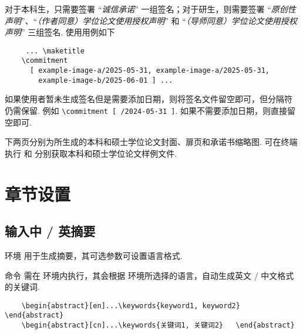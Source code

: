 对于本科生，只需要签署 ``\emph*{诚信承诺}'' 一组签名；对于研生，则需要签署 ``\emph*{原创性声明}''、``\emph*{（作者同意）学位论文使用授权声明}'' 和 ``\emph*{（导师同意）学位论文使用授权声明}'' 三组签名. 使用用例如下

\begin{framed}
  \begin{verbatim}
     ... \maketitle
    \commitment
      [ example-image-a/2025-05-31, example-image-a/2025-05-31,
        example-image-b/2025-06-01 ] ... 
  \end{verbatim}
\end{framed}

如果使用者暂未生成签名但是需要添加日期，则将签名文件留空即可，但分隔符 \cmd{/} 仍需保留. 例如 
\verb|\commitment [ /2024-05-31 ]|. 如果不需要添加日期，则直接留空即可.

下两页分别为所生成的本科和硕士学位论文封面、扉页和承诺书缩略图. 可在终端执行  和   分别获取本科和硕士学位论文样例文件.


\section{章节设置}

\subsection{输入中 / 英摘要}

环境  用于生成摘要，其可选参数可设置语言格式.

\DescribeMacro{\keywords}
命令  需在  环境内执行，其会根据  环境所选择的语言，自动生成英文 / 中文格式的关键词.

\begin{framed}
  \begin{verbatim}
    \begin{abstract}[en]...\keywords{keyword1, keyword2}  \end{abstract}
    \begin{abstract}[cn]...\keywords{关键词1, 关键词2}   \end{abstract}
  \end{verbatim}
\end{framed}

